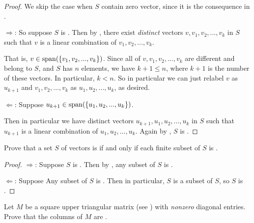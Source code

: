 \begin{proof}
We skip the case when \(S\) contain zero vector, since it is the consequence in .

\(\Longrightarrow\):
So suppose \(S\) is \LDP{}{}.
Then by , there exist \emph{distinct} vectors \(v, v_1, v_2, ..., v_k\) in \(S\) such that \(v\) is a linear combination of \(v_1, v_2, ..., v_k\).

That is, \(v \in \operatorname{span}(\{ v_1, v_2, ..., v_k \})\).
Since all of \(v, v_1, v_2, ..., v_k\) are different and belong to \(S\), and \(S\) has \(n\) elements, we have \(k + 1 \le n\), where \(k + 1\) is the number of these vectors.
In particular, \(k < n\).
So in particular we can just relabel \(v\) as \(u_{k + 1}\) and \(v_1, v_2, ..., v_k\) as \(u_1, u_2, ..., u_k\), as desired.

\(\Longleftarrow\):
Suppose \(u_{k + 1} \in \operatorname{span}(\{ u_1, u_2, ..., u_k \})\).

Then in particular we have distinct vectors \(u_{k + 1}, u_1, u_2, ..., u_k\) in \(S\) such that \(u_{k + 1}\) is a linear combination of \(u_1, u_2, ..., u_k\).
Again by , \(S\) is \LDP{}{}.
\end{proof}

\begin{exercise} \label{exercise 1.5.16}
Prove that a set \(S\) of vectors is \LID{} if and only if each finite subset of \(S\) is \LID{}.
\end{exercise}

\begin{proof}
\(\Longrightarrow\):
Suppose \(S\) is \LID{}.
Then by , any subset of \(S\) is \LID{}.

\(\Longleftarrow\):
Suppose Any subset of \(S\) is \LID{}.
Then in particular, \(S\) is a subset of \(S\), so \(S\) is \LID{}.
\end{proof}

\begin{exercise} \label{exercise 1.5.17}
Let \(M\) be a square upper triangular matrix (see ) with \emph{nonzero} diagonal entries.
Prove that the columns of \(M\) are \LID{}.
\end{exercise}

